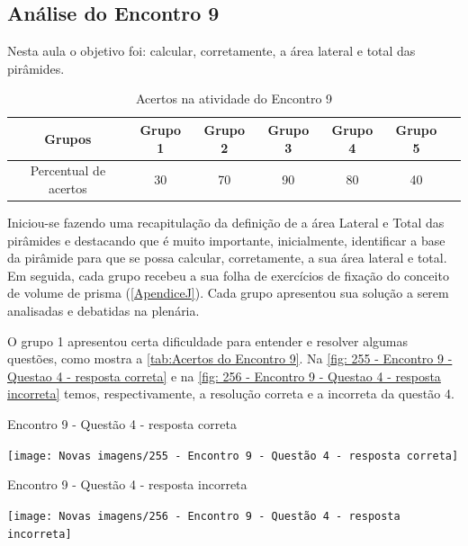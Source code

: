 \subsection{Análise do Encontro 9}

Nesta aula o objetivo foi: calcular, corretamente, a área lateral e total das pirâmides.

\begin{table}[htbp] \centering
    \caption{Acertos na atividade do Encontro 9} \label{tab:Acertos do Encontro 9}
    \begin{tabular}{|c|c|c|c|c|c|c|}
        \hline
        \textbf{Grupos}       & \textbf{Grupo 1} & \textbf{Grupo 2} & \textbf{Grupo 3} & \textbf{Grupo 4} & \textbf{Grupo 5} \\
        \hline
        Percentual de acertos & 30               & 70               & 90               & 80               & 40               \\
        \hline
    \end{tabular}
    \legend{\legendaTabela}
\end{table}

Iniciou-se fazendo uma recapitulação da definição de a área Lateral e Total das pirâmides e destacando que é muito importante, inicialmente, identificar a base da pirâmide para que se possa calcular, corretamente, a sua área lateral e total. Em seguida, cada grupo recebeu a sua folha de exercícios de fixação do conceito de volume de prisma (\autoref{ApendiceJ}). Cada grupo apresentou sua solução a serem analisadas e debatidas na plenária.

O grupo 1 apresentou certa dificuldade para entender e resolver algumas questões, como mostra a \autoref{tab:Acertos do Encontro 9}. Na \autoref{fig: 255 - Encontro 9 - Questao 4 - resposta correta} e na \autoref{fig: 256 - Encontro 9 - Questao 4 - resposta incorreta} temos, respectivamente, a resolução correta e a incorreta da questão 4.

\begin{CenteredFigure}
    \caption{Encontro 9 - Questão 4 - resposta correta} \label{fig: 255 - Encontro 9 - Questao 4 - resposta correta}
    \texttt{[image: Novas imagens/255 - Encontro 9 - Questão 4 - resposta correta]}
    \legend{\autoria}
\end{CenteredFigure}

\begin{CenteredFigure}
    \caption{Encontro 9 - Questão 4 - resposta incorreta} \label{fig: 256 - Encontro 9 - Questao 4 - resposta incorreta}
    \texttt{[image: Novas imagens/256 - Encontro 9 - Questão 4 - resposta incorreta]}
    \legend{\autoria}
\end{CenteredFigure}


